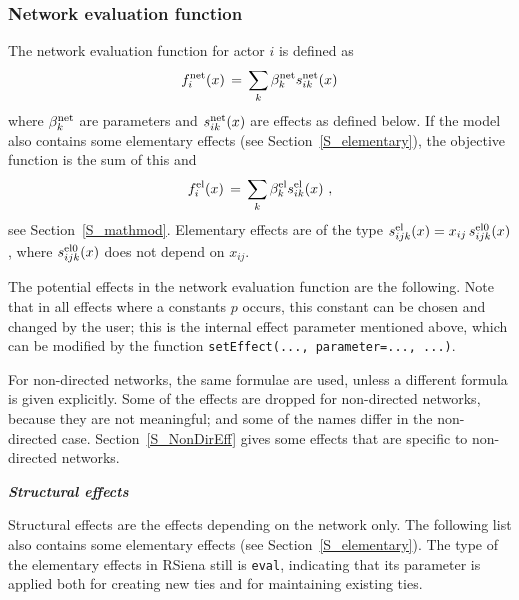 \documentclass[a4paper,fleqn,11pt]{article}
\newcommand{\+}{\, + \,}
\newcommand{\RS}{{\sf \textsf{RSiena} }}
\begin{document}
\subsubsection{Network evaluation function}
\label{S_f}

The network evaluation function for actor $i$ is defined as
\begin{equation}
f^{\rm net}_i(x) \, = \,
              \sum_k \beta^{\rm net}_k s^{\rm net}_{ik}(x)   \label{f_net}
\end{equation}
where $\beta^{\rm net}_k$ are parameters and $s^{\rm net}_{ik}(x)$
are effects as defined below.
If the model also contains some elementary effects
(see Section~\ref{S_elementary}), the objective
function is the sum of this and
\begin{equation}
f^{\rm el}_i(x) \, = \,
              \sum_k \beta^{\rm el}_k s^{\rm el}_{ik}(x)  \ , \label{f_el_net}
\end{equation}
see Section~\ref{S_mathmod}.
Elementary effects are of the type $s^{\rm el}_{ijk}(x) = x_{ij}\,s^{\rm el0}_{ijk}(x)$,
where $s^{\rm el0}_{ijk}(x)$ does not depend on $x_{ij}$.


The potential effects in the \hypertarget{T_objective}{network
evaluation function}
are the following. Note that in all
effects where a constants $p$ occurs, this constant can be chosen
and changed by the user;
this is the internal effect parameter mentioned above,
which can be modified by the function \texttt{setEffect(..., parameter=..., ...)}.

For non-directed networks, the same formulae are used,
unless a different formula is given explicitly.
Some of the effects are dropped for non-directed networks, because
they are not meaningful; and some of the names differ in the
non-directed case.
Section~\ref{S_NonDirEff} gives some effects that are specific
to non-directed networks.
\medskip

\noindent
\textbf{\emph{Structural effects}}
\medskip

\noindent
Structural effects are the effects depending on the network only.
The following list also contains some elementary effects
(see Section~\ref{S_elementary}).
The type of the elementary effects in \RS still is \texttt{eval},
indicating that its parameter is applied both for creating new ties
and for maintaining existing ties.
\end{document}
